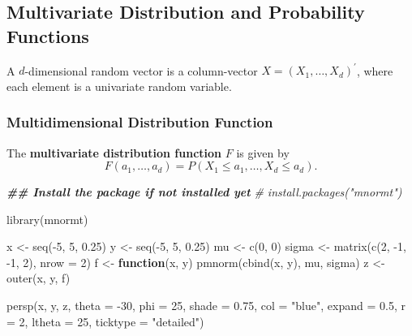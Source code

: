 \documentclass[
  14pt,
]{memoir}
\newenvironment{Shaded}{\begin{snugshade}}{\end{snugshade}}
\newcommand{\AttributeTok}[1]{\textcolor[rgb]{0.77,0.63,0.00}{#1}}
\newcommand{\CommentTok}[1]{\textcolor[rgb]{0.56,0.35,0.01}{\textit{#1}}}
\newcommand{\ControlFlowTok}[1]{\textcolor[rgb]{0.13,0.29,0.53}{\textbf{#1}}}
\newcommand{\DecValTok}[1]{\textcolor[rgb]{0.00,0.00,0.81}{#1}}
\newcommand{\DocumentationTok}[1]{\textcolor[rgb]{0.56,0.35,0.01}{\textbf{\textit{#1}}}}
\newcommand{\FloatTok}[1]{\textcolor[rgb]{0.00,0.00,0.81}{#1}}
\newcommand{\FunctionTok}[1]{\textcolor[rgb]{0.00,0.00,0.00}{#1}}
\newcommand{\NormalTok}[1]{#1}
\newcommand{\OtherTok}[1]{\textcolor[rgb]{0.56,0.35,0.01}{#1}}
\newcommand{\SpecialCharTok}[1]{\textcolor[rgb]{0.00,0.00,0.00}{#1}}
\newcommand{\StringTok}[1]{\textcolor[rgb]{0.31,0.60,0.02}{#1}}
\begin{document}
\hypertarget{multivariate-distribution-and-probability-functions}{%
\subsection{Multivariate Distribution and Probability Functions}\label{multivariate-distribution-and-probability-functions}}

A \(d\)-dimensional random vector is a column-vector \(X=(X_1,\dots,X_d)^\prime\), where each element is a univariate random variable.

\hypertarget{multidimensional-distribution-function}{%
\subsubsection{Multidimensional Distribution Function}\label{multidimensional-distribution-function}}

The \textbf{multivariate distribution function} \(F\) is given by
\[F(a_1,\dots,a_d)=P(X_1\le a_1,\dots,X_d\le a_d).\]

\begin{Shaded}
\begin{Highlighting}[]
\DocumentationTok{\#\# Install the package if not installed yet}
\CommentTok{\# install.packages("mnormt")}

\FunctionTok{library}\NormalTok{(mnormt)}

\NormalTok{x     }\OtherTok{\textless{}{-}} \FunctionTok{seq}\NormalTok{(}\SpecialCharTok{{-}}\DecValTok{5}\NormalTok{, }\DecValTok{5}\NormalTok{, }\FloatTok{0.25}\NormalTok{) }
\NormalTok{y     }\OtherTok{\textless{}{-}} \FunctionTok{seq}\NormalTok{(}\SpecialCharTok{{-}}\DecValTok{5}\NormalTok{, }\DecValTok{5}\NormalTok{, }\FloatTok{0.25}\NormalTok{)}
\NormalTok{mu    }\OtherTok{\textless{}{-}} \FunctionTok{c}\NormalTok{(}\DecValTok{0}\NormalTok{, }\DecValTok{0}\NormalTok{)}
\NormalTok{sigma }\OtherTok{\textless{}{-}} \FunctionTok{matrix}\NormalTok{(}\FunctionTok{c}\NormalTok{(}\DecValTok{2}\NormalTok{, }\SpecialCharTok{{-}}\DecValTok{1}\NormalTok{, }\SpecialCharTok{{-}}\DecValTok{1}\NormalTok{, }\DecValTok{2}\NormalTok{), }\AttributeTok{nrow =} \DecValTok{2}\NormalTok{)}
\NormalTok{f     }\OtherTok{\textless{}{-}} \ControlFlowTok{function}\NormalTok{(x, y) }\FunctionTok{pmnorm}\NormalTok{(}\FunctionTok{cbind}\NormalTok{(x, y), mu, sigma)}
\NormalTok{z     }\OtherTok{\textless{}{-}} \FunctionTok{outer}\NormalTok{(x, y, f)}

\FunctionTok{persp}\NormalTok{(x, y, z, }\AttributeTok{theta =} \SpecialCharTok{{-}}\DecValTok{30}\NormalTok{, }\AttributeTok{phi =} \DecValTok{25}\NormalTok{, }
      \AttributeTok{shade =} \FloatTok{0.75}\NormalTok{, }\AttributeTok{col =} \StringTok{"blue"}\NormalTok{, }\AttributeTok{expand =} \FloatTok{0.5}\NormalTok{, }\AttributeTok{r =} \DecValTok{2}\NormalTok{, }
      \AttributeTok{ltheta =} \DecValTok{25}\NormalTok{, }\AttributeTok{ticktype =} \StringTok{"detailed"}\NormalTok{)}
\end{Highlighting}
\end{Shaded}
\end{document}
